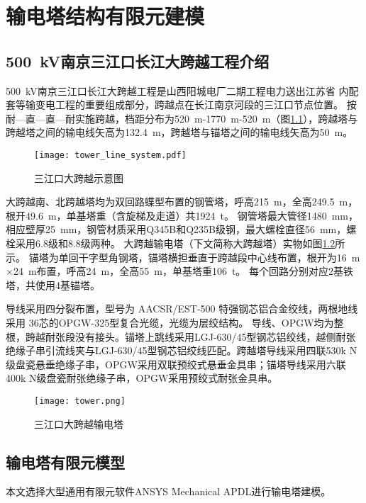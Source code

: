 \graphicspath{{figures/tower/}}
\chapter{输电塔结构有限元建模}\label{chapter:tower}
\section{\SI{500}{kV}南京三江口长江大跨越工程介绍}
\SI{500}{kV}南京三江口长江大跨越工程是山西阳城电厂二期工程电力送出江苏省
内配套等输变电工程的重要组成部分，跨越点在长江南京河段的三江口节点位置。
按耐—直—直—耐实施跨越，档距分布为\SI{520}{m}-\SI{1770}{m}-\SI{520}{m}（图\ref{fig:tower-line}），跨越塔与跨越塔之间的输电线矢高为\SI{132.4}{m}，跨越塔与锚塔之间的输电线矢高为\SI{50}{m}。
\begin{figure}[!htbp]
\centering
\texttt{[image: tower\_line\_system.pdf]}
\caption{三江口大跨越示意图}
\label{fig:tower-line}
\end{figure}

大跨越南、北跨越塔均为双回路蝶型布置的钢管塔，呼高\SI{215}{m}，全高\SI{249.5}{m}，根开\SI{49.6}{m}，单基塔重（含旋梯及走道）共\SI{1924}{t}。
钢管塔最大管径\SI{1480}{mm}，相应壁厚\SI{25}{mm}，钢管材质采用Q345B和Q235B级钢，最大螺栓直径\SI{56}{mm}，螺栓采用6.8级和8.8级两种。
大跨越输电塔（下文简称大跨越塔）实物如图\ref{fig:real-tower}所示。
锚塔为单回干字型角钢塔，锚塔横担垂直于跨越段中心线布置，根开为\SI{16}{m}$\times$\SI{24}{m}布置，呼高\SI{24}{m}，全高\SI{55}{m}，单基塔重\SI{106}{t}。
每个回路分别对应2基铁塔，共使用4基锚塔。

导线采用四分裂布置，型号为 AACSR/EST-500 特强钢芯铝合金绞线，两根地线采用 36芯的OPGW-325型复合光缆，光缆为层绞结构。
导线、OPGW均为整根，跨越耐张段没有接头。锚塔上跳线采用LGJ-630/45型钢芯铝绞线，越侧耐张绝缘子串引流线夹与LGJ-630/45型钢芯铝绞线匹配。跨越塔导线采用四联530k N级盘瓷悬垂绝缘子串，OPGW采用双联预绞式悬垂金具串；锚塔导线采用六联400k N级盘瓷耐张绝缘子串，OPGW采用预绞式耐张金具串。
\begin{figure}[!htbp]
\centering
\texttt{[image: tower.png]}
\caption{三江口大跨越输电塔}
\label{fig:real-tower}
\end{figure}

\section{输电塔有限元模型}
本文选择大型通用有限元软件ANSYS Mechanical APDL进行输电塔建模。

